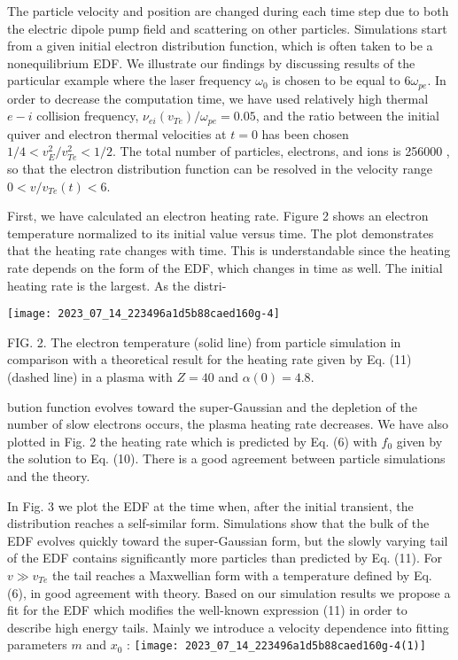\documentclass[10pt]{article}
\begin{document}
The particle velocity and position are changed during each time step due to both the electric dipole pump field and scattering on other particles. Simulations start from a given initial electron distribution function, which is often taken to be a nonequilibrium EDF. We illustrate our findings by discussing results of the particular example where the laser frequency $\omega_{0}$ is chosen to be equal to $6 \omega_{p e}$. In order to decrease the computation time, we have used relatively high thermal $e-i$ collision frequency, $\nu_{e i}\left(v_{T e}\right) / \omega_{p e}=0.05$, and the ratio between the initial quiver and electron thermal velocities at $t=0$ has been chosen $1 / 4<v_{E}^{2} / v_{T e}^{2}<1 / 2$. The total number of particles, electrons, and ions is 256000 , so that the electron distribution function can be resolved in the velocity range $0<v / v_{T e}(t)<6$.

First, we have calculated an electron heating rate. Figure 2 shows an electron temperature normalized to its initial value versus time. The plot demonstrates that the heating rate changes with time. This is understandable since the heating rate depends on the form of the EDF, which changes in time as well. The initial heating rate is the largest. As the distri-

\begin{center}
\texttt{[image: 2023\_07\_14\_223496a1d5b88caed160g-4]}
\end{center}

FIG. 2. The electron temperature (solid line) from particle simulation in comparison with a theoretical result for the heating rate given by Eq. (11) (dashed line) in a plasma with $Z=40$ and $\alpha(0)=4.8$.

bution function evolves toward the super-Gaussian and the depletion of the number of slow electrons occurs, the plasma heating rate decreases. We have also plotted in Fig. 2 the heating rate which is predicted by Eq. (6) with $f_{0}$ given by the solution to Eq. (10). There is a good agreement between particle simulations and the theory.

In Fig. 3 we plot the EDF at the time when, after the initial transient, the distribution reaches a self-similar form. Simulations show that the bulk of the EDF evolves quickly toward the super-Gaussian form, but the slowly varying tail of the EDF contains significantly more particles than predicted by Eq. (11). For $v \gg v_{T e}$ the tail reaches a Maxwellian form with a temperature defined by Eq. (6), in good agreement with theory. Based on our simulation results we propose a fit for the EDF which modifies the well-known expression (11) in order to describe high energy tails. Mainly we introduce a velocity dependence into fitting parameters $m$ and $x_{0}$ :
\texttt{[image: 2023\_07\_14\_223496a1d5b88caed160g-4(1)]}
\end{document}
